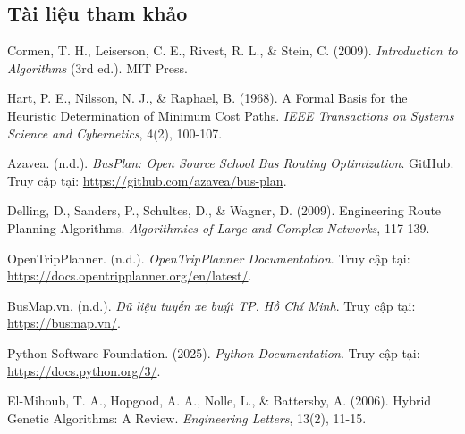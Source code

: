 \documentclass[a4paper,12pt]{article}
\begin{document}
\newpage
\begin{center}
\section*{Tài liệu tham khảo}
\end{center}
\vspace{-2em}
\renewcommand{\refname}{}
\begin{thebibliography}{99}

Cormen, T. H., Leiserson, C. E., Rivest, R. L., \& Stein, C. (2009). \textit{Introduction to Algorithms} (3rd ed.). MIT Press.

Hart, P. E., Nilsson, N. J., \& Raphael, B. (1968). A Formal Basis for the Heuristic Determination of Minimum Cost Paths. \textit{IEEE Transactions on Systems Science and Cybernetics}, 4(2), 100-107.

Azavea. (n.d.). \textit{BusPlan: Open Source School Bus Routing Optimization}. GitHub. Truy cập tại: \url{https://github.com/azavea/bus-plan}.

Delling, D., Sanders, P., Schultes, D., \& Wagner, D. (2009). Engineering Route Planning Algorithms. \textit{Algorithmics of Large and Complex Networks}, 117-139.

OpenTripPlanner. (n.d.). \textit{OpenTripPlanner Documentation}. Truy cập tại: \url{https://docs.opentripplanner.org/en/latest/}.

BusMap.vn. (n.d.). \textit{Dữ liệu tuyến xe buýt TP. Hồ Chí Minh}. Truy cập tại: \url{https://busmap.vn/}.

Python Software Foundation. (2025). \textit{Python Documentation}. Truy cập tại: \url{https://docs.python.org/3/}.

El-Mihoub, T. A., Hopgood, A. A., Nolle, L., \& Battersby, A. (2006). Hybrid Genetic Algorithms: A Review. \textit{Engineering Letters}, 13(2), 11-15.

\end{thebibliography}
\end{document}
